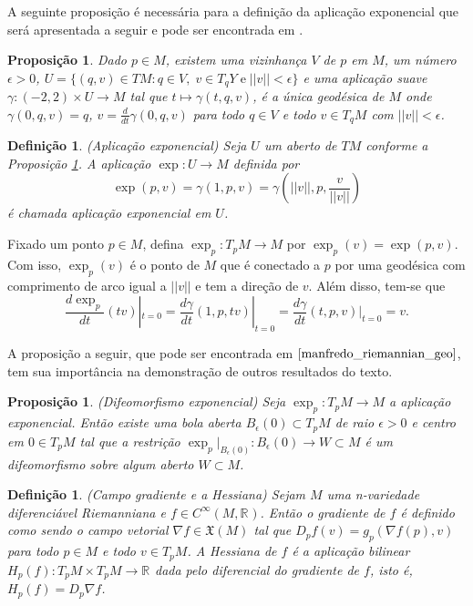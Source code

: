 \documentclass[12pt]{book}
\newtheorem{definicao}[teorema]{Definição}
\newtheorem{proposicao}[teorema]{Proposição}
\newcommand{\campossuaves}[1]{\mathfrak{X}(#1)}
\newcommand{\derivada}[2]{\frac{d #1}{d #2}}
\newcommand{\espacotangenteponto}[2]{T_{#1}#2}
\newcommand{\funcoessuaves}[1]{C^{\infty}(#1, \real{})}
\newcommand{\gradiente}{\nabla f}
\newcommand{\norma}[1]{||#1||}
\newcommand{\real}[1]{\mathbb{R}^{#1}}
\newcommand{\reta}{\real{}}
\begin{document}
	A seguinte proposição é necessária para a definição da aplicação exponencial que será apresentada a seguir e pode ser encontrada em \cite{manfredo_riemannian_geo}.
	
	\begin{proposicao}\label{proposicao_existencia_geodesica}
		Dado $p\in M$, existem uma vizinhança $V$ de $p$ em $M$, um número $\epsilon>0$, $U=\{(q, v) \in TM: q\in V,\;v\in \espacotangenteponto{q}{Y}\;\text{e}\;\norma{v}<\epsilon \}$ e uma aplicação suave $\gamma:(-2,2)\times U \to M$ tal que $t\mapsto \gamma(t, q, v)$, é a única geodésica de $M$ onde $\gamma(0, q, v)=q$, $v=\derivada{}{t}\gamma(0,q,v)$ para todo $q\in V$ e todo $v\in \espacotangenteponto{q}{M}$ com $\norma{v}<\epsilon$.
	\end{proposicao}
	
	\begin{definicao}\label{definicao_aplicacao_exponencial}
		(Aplicação exponencial) Seja $U$ um aberto de $TM$ conforme a Proposição \ref{proposicao_existencia_geodesica}. A aplicação $\exp:U \to M$ definida por
		$$
		\exp(p,v) = \gamma(1, p,v)=\gamma(\norma{v}, p,\frac{v}{\norma{v}})
		$$
		é chamada aplicação exponencial em $U$.
	\end{definicao}
	
	Fixado um ponto $p \in M$, defina $\exp_{p}:T_{p}M \to M$ por $\exp_{p}(v) = \exp(p,v)$. Com isso, $\exp_{p}(v)$ é o ponto de $M$ que é conectado a $p$ por uma geodésica com comprimento de arco igual a $\norma{v}$ e tem a direção de $v$. Além disso, tem-se que
	$$
	\derivada{\exp_{p}}{t}(tv)|_{t=0} = \derivada{\gamma}{t}(1,p,tv)|_{t=0}=\derivada{\gamma}{t}(t,p,v)|_{t=0}=v.
	$$
	
	A proposição a seguir, que pode ser encontrada em $\cite{manfredo_riemannian_geo}$, tem sua importância na demonstração de outros resultados do texto.
	
	\begin{proposicao}\label{proposicao_difeomorfismo_exponencial}
		(Difeomorfismo exponencial) Seja  $\exp_{p}:T_{p}M \to M$ a aplicação exponencial. Então existe uma bola aberta $B_{\epsilon}(0) \subset \espacotangenteponto{p}{M}$ de raio $\epsilon>0$ e centro em $0 \in T_{p}M$ tal que a restrição $\exp_{p}|_{B_{\epsilon}(0)}:B_{\epsilon}(0) \to W \subset M$ é um difeomorfismo sobre algum aberto $W \subset M$.
	\end{proposicao}
	
	\begin{definicao}\label{definicao_gradiente_hessiana}
		(Campo gradiente e a Hessiana) Sejam $M$ uma n-variedade diferenciável Riemanniana e $f\in \funcoessuaves{M}$. Então o gradiente de $f$ é definido como sendo o campo vetorial $\gradiente \in \campossuaves{M}$ tal que $D_{p}f(v) = g_{p}(\gradiente(p), v)$ para todo $p\in M$ e todo $v \in T_{p}M$. A Hessiana de $f$ é a aplicação bilinear $H_{p}(f): T_{p}M\times T_{p}M \to \reta$ dada pelo diferencial do gradiente de $f$, isto é, $H_{p}(f) = D_{p}\gradiente$.
	\end{definicao}
	
\end{document}
